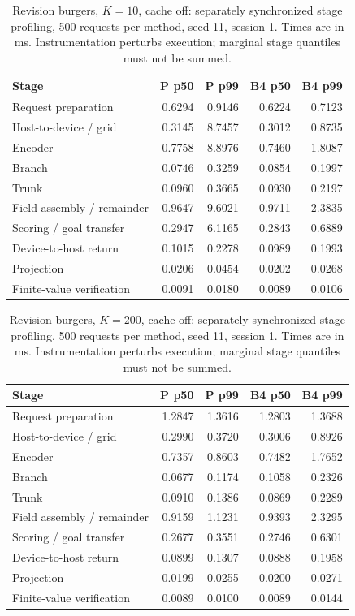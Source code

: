 \begin{table}[ht]
\centering\small
\caption{Revision burgers, $K=10$, cache off: separately synchronized stage profiling, 500 requests per method, seed 11, session 1. Times are in ms. Instrumentation perturbs execution; marginal stage quantiles must not be summed.}\label{tab:e2_profile_burgers_10_off}
\begin{tabular}{@{}lrrrr@{}}\toprule
Stage & P p50 & P p99 & B4 p50 & B4 p99\\\midrule
Request preparation & 0.6294 & 0.9146 & 0.6224 & 0.7123\\
Host-to-device / grid & 0.3145 & 8.7457 & 0.3012 & 0.8735\\
Encoder & 0.7758 & 8.8976 & 0.7460 & 1.8087\\
Branch & 0.0746 & 0.3259 & 0.0854 & 0.1997\\
Trunk & 0.0960 & 0.3665 & 0.0930 & 0.2197\\
Field assembly / remainder & 0.9647 & 9.6021 & 0.9711 & 2.3835\\
Scoring / goal transfer & 0.2947 & 6.1165 & 0.2843 & 0.6889\\
Device-to-host return & 0.1015 & 0.2278 & 0.0989 & 0.1993\\
Projection & 0.0206 & 0.0454 & 0.0202 & 0.0268\\
Finite-value verification & 0.0091 & 0.0180 & 0.0089 & 0.0106\\
\bottomrule\end{tabular}
\end{table}

\begin{table}[ht]
\centering\small
\caption{Revision burgers, $K=200$, cache off: separately synchronized stage profiling, 500 requests per method, seed 11, session 1. Times are in ms. Instrumentation perturbs execution; marginal stage quantiles must not be summed.}\label{tab:e2_profile_burgers_200_off}
\begin{tabular}{@{}lrrrr@{}}\toprule
Stage & P p50 & P p99 & B4 p50 & B4 p99\\\midrule
Request preparation & 1.2847 & 1.3616 & 1.2803 & 1.3688\\
Host-to-device / grid & 0.2990 & 0.3720 & 0.3006 & 0.8926\\
Encoder & 0.7357 & 0.8603 & 0.7482 & 1.7652\\
Branch & 0.0677 & 0.1174 & 0.1058 & 0.2326\\
Trunk & 0.0910 & 0.1386 & 0.0869 & 0.2289\\
Field assembly / remainder & 0.9159 & 1.1231 & 0.9393 & 2.3295\\
Scoring / goal transfer & 0.2677 & 0.3551 & 0.2746 & 0.6301\\
Device-to-host return & 0.0899 & 0.1307 & 0.0888 & 0.1958\\
Projection & 0.0199 & 0.0255 & 0.0200 & 0.0271\\
Finite-value verification & 0.0089 & 0.0100 & 0.0089 & 0.0144\\
\bottomrule\end{tabular}
\end{table}

